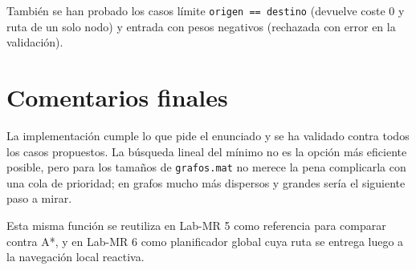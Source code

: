 Tambi\'{e}n se han probado los casos l\'{i}mite \texttt{origen == destino} (devuelve coste $0$ y ruta de un solo nodo) y entrada con pesos negativos (rechazada con error en la validaci\'{o}n).


\section{Comentarios finales}

La implementaci\'{o}n cumple lo que pide el enunciado y se ha validado contra todos los casos propuestos. La b\'{u}squeda lineal del m\'{i}nimo no es la opci\'{o}n m\'{a}s eficiente posible, pero para los tama\~{n}os de \texttt{grafos.mat} no merece la pena complicarla con una cola de prioridad; en grafos mucho m\'{a}s dispersos y grandes ser\'{i}a el siguiente paso a mirar.

Esta misma funci\'{o}n se reutiliza en Lab-MR 5 como referencia para comparar contra A*, y en Lab-MR 6 como planificador global cuya ruta se entrega luego a la navegaci\'{o}n local reactiva.
